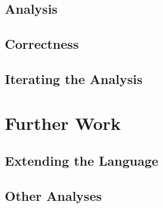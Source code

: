 \documentclass[11pt,a4paper]{article}
\begin{document}
\CodeSubsetSubset
\CodeSubsetOpSubseteq

\subsection{Analysis}

\CodeLiveExpr

\subsection{Correctness}

\subsection{Iterating the Analysis}


\section{Further Work}

\subsection{Extending the Language}

\subsection{Other Analyses}


{}
\end{document}
